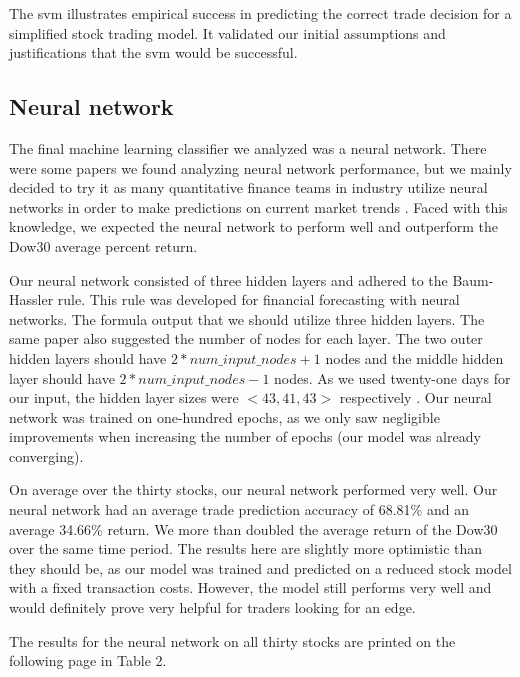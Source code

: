 \documentclass{article}
\begin{document}
The svm illustrates empirical success in predicting the correct trade decision for a simplified stock trading model. It validated our initial assumptions and justifications that the svm would be successful.

\subsection{Neural network}
The final machine learning classifier we analyzed was a neural network. There were some papers we found analyzing neural network performance, but we mainly decided to try it as many quantitative finance teams in industry utilize neural networks in order to make predictions on current market trends \cite{naeinitaremian}. Faced with this knowledge, we expected the neural network to perform well and outperform the Dow30 average percent return.

Our neural network consisted of three hidden layers and adhered to the Baum-Hassler rule. This rule was developed for financial forecasting with neural networks. The formula output that we should utilize three hidden layers. The same paper also suggested the number of nodes for each layer. The two outer hidden layers should have $2*num\_input\_nodes + 1$ nodes and the middle hidden layer should have $2*num\_input\_nodes - 1$ nodes. As we used twenty-one days for our input, the hidden layer sizes were $<43,41,43>$ respectively \cite{yaotan}. Our neural network was trained on one-hundred epochs, as we only saw negligible improvements when increasing the number of epochs (our model was already converging).

On average over the thirty stocks, our neural network performed very well. Our neural network had an average trade prediction accuracy of 68.81\% and an average 34.66\% return. We more than doubled the average return of the Dow30 over the same time period. The results here are slightly more optimistic than they should be, as our model was trained and predicted on a reduced stock model with a fixed transaction costs. However, the model still performs very well and would definitely prove very helpful for traders looking for an edge.

The results for the neural network on all thirty stocks are printed on the following page in Table 2.
\end{document}
